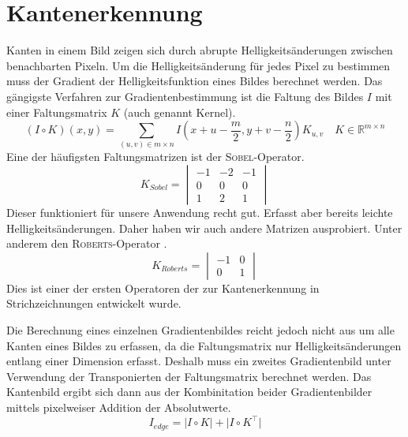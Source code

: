 \section*{Kantenerkennung}

Kanten in einem Bild zeigen sich durch abrupte Helligkeitsänderungen zwischen benachbarten Pixeln.
Um die Helligkeitsänderung für jedes Pixel zu bestimmen muss der Gradient der
Helligkeitsfunktion eines Bildes berechnet werden.
Das gängigste Verfahren zur Gradientenbestimmung ist die Faltung des Bildes $I$ mit einer Faltungsmatrix $K$ (auch genannt Kernel).
  \[ (I\circ K)(x,y) =
       \sum_{(u,v)\in m\times n}
       I\left(x+u-\frac{m}{2},y+v-\frac{n}{2}\right)K_{u,v}
       \quad K\in\mathbb{R}^{m\times n} \]
Eine der häufigsten Faltungsmatrizen ist der \textsc{Sobel}-Operator.
  \[ K_{Sobel} = \begin{vmatrix}
           -1 & -2 & -1 \\
            0 &  0 &  0 \\
            1 &  2 &  1
         \end{vmatrix} \]
Dieser funktioniert für unsere Anwendung recht gut. Erfasst aber bereits leichte Helligkeitsänderungen.
Daher haben wir auch andere Matrizen ausprobiert.
Unter anderem den \textsc{Roberts}-Operator \cite{DBLP:books/garland/Roberts63}.
  \[ K_{Roberts} = \begin{vmatrix}
           -1 & 0 \\
            0 & 1
         \end{vmatrix} \]
Dies ist einer der ersten Operatoren der zur Kantenerkennung in Strichzeichnungen entwickelt wurde.

Die Berechnung eines einzelnen Gradientenbildes reicht jedoch nicht aus um alle Kanten eines Bildes zu erfassen, da die Faltungsmatrix nur Helligkeitsänderungen entlang einer Dimension erfasst.
Deshalb muss ein zweites Gradientenbild unter Verwendung der Transponierten der Faltungsmatrix berechnet werden.
Das Kantenbild ergibt sich dann aus der Kombinitation beider Gradientenbilder mittels pixelweiser Addition der Absolutwerte.
  \[ I_{edge} = \Big|I \circ K\Big| + \Big|I \circ K^\top\Big| \]
